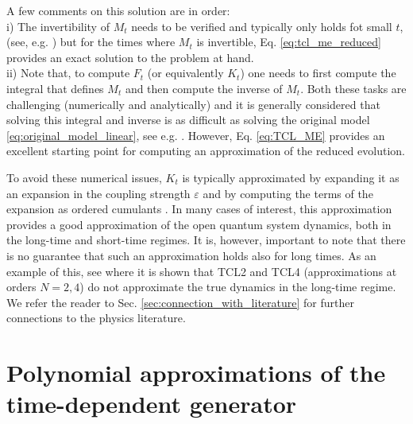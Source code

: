 \documentclass[twocolumn]{autart}    %
\begin{document}
A few comments on this solution are in order:\\ 
i) The invertibility of $M_t$ needs to be verified and typically only holds fot small $t$, (see, e.g. \cite{breuer2002theory}) but for the times where $M_t$ is invertible, Eq. \eqref{eq:tcl_me_reduced} provides an exact solution to the problem at hand. \\
ii) Note that, to compute $F_t$ (or equivalently $K_t$) one needs to first compute the integral that defines $M_t$ and then compute the inverse of $M_t$. Both these tasks are challenging (numerically and analytically) and it is generally considered that solving this integral and inverse is as difficult as solving the original model \eqref{eq:original_model_linear}, see e.g. \cite{breuer2007}. However, Eq. \eqref{eq:TCL_ME} provides an excellent starting point for computing an approximation of the reduced evolution. 

To avoid these numerical issues, $K_t$ is typically approximated by expanding it as an expansion in the coupling strength $\varepsilon$ and by computing the terms of the expansion as ordered cumulants \cite{breuer2002theory,breuer2006,nestmann2019time}.
In many cases of interest, this approximation provides a good approximation of the open quantum system dynamics, both in the long-time and short-time regimes. It is, however, important to note that there is no guarantee that such an approximation holds also for long times. As an example of this, see \cite{breuer2007} where it is shown that TCL2 and TCL4 (approximations at orders $N=2,4$) do not approximate the true dynamics in the long-time regime.
We refer the reader to Sec. \ref{sec:connection_with_literature} for further connections to the physics literature.

\section{Polynomial approximations of the time-dependent generator}
\label{sec:time_ordered}
\end{document}
